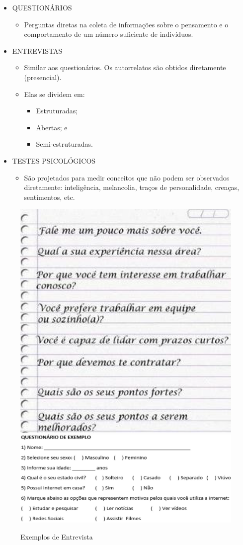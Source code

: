 \documentclass[
]{book}
\providecommand{\tightlist}{%
  \setlength{\itemsep}{0pt}\setlength{\parskip}{0pt}}
\begin{document}
\begin{itemize}
\tightlist
\item
  QUESTIONÁRIOS

  \begin{itemize}
  \tightlist
  \item
    Perguntas diretas na coleta de informações sobre o pensamento e o comportamento de um número suficiente de indivíduos.
  \end{itemize}
\item
  ENTREVISTAS

  \begin{itemize}
  \tightlist
  \item
    Similar aos questionários. Os autorrelatos são obtidos diretamente (presencial).
  \item
    Elas se dividem em:

    \begin{itemize}
    \tightlist
    \item
      Estruturadas;
    \item
      Abertas; e
    \item
      Semi-estruturadas.
    \end{itemize}
  \end{itemize}
\item
  TESTES PSICOLÓGICOS

  \begin{itemize}
  \tightlist
  \item
    São projetados para medir conceitos que não podem ser observados diretamente: inteligência, melancolia, traços de personalidade, crenças, sentimentos, etc.
  \end{itemize}
\end{itemize}

\begin{figure}

{\centering \includegraphics[width=0.5\linewidth]{imagens/entrevista-exemplo1} \includegraphics[width=0.5\linewidth]{imagens/entrevista-exemplo2} 

}

\caption{Exemplos de Entrevista}\label{fig:unnamed-chunk-10}
\end{figure}
\end{document}
